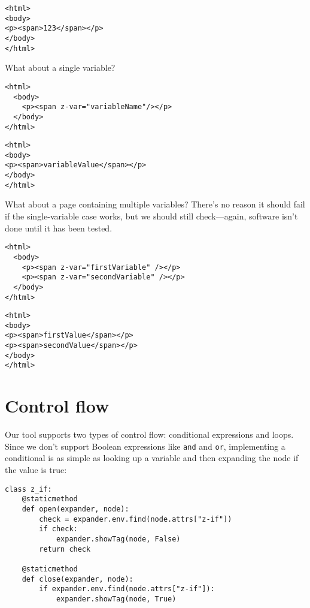 \documentclass{scrbook}
\begin{document}
\begin{lstlisting}[frame=single,frameround=tttt]
<html>
<body>
<p><span>123</span></p>
</body>
</html>
\end{lstlisting}



What about a single variable?


\begin{lstlisting}[frame=single,frameround=tttt]
<html>
  <body>
    <p><span z-var="variableName"/></p>
  </body>
</html>
\end{lstlisting}



\begin{lstlisting}[frame=single,frameround=tttt]
<html>
<body>
<p><span>variableValue</span></p>
</body>
</html>
\end{lstlisting}



What about a page containing multiple variables?
There's no reason it should fail if the single-variable case works,
but we should still check—again,
software isn't done until it has been tested.


\begin{lstlisting}[frame=single,frameround=tttt]
<html>
  <body>
    <p><span z-var="firstVariable" /></p>
    <p><span z-var="secondVariable" /></p>
  </body>
</html>
\end{lstlisting}



\begin{lstlisting}[frame=single,frameround=tttt]
<html>
<body>
<p><span>firstValue</span></p>
<p><span>secondValue</span></p>
</body>
</html>
\end{lstlisting}


\section{Control flow}\label{templating-flow}


Our tool supports two types of control flow:
conditional expressions and loops.
Since we don't support Boolean expressions like \texttt{and} and \texttt{or},
implementing a conditional is as simple as looking up a variable
and then expanding the node if the value is true:


\begin{lstlisting}[frame=single,frameround=tttt]
class z_if:
    @staticmethod
    def open(expander, node):
        check = expander.env.find(node.attrs["z-if"])
        if check:
            expander.showTag(node, False)
        return check

    @staticmethod
    def close(expander, node):
        if expander.env.find(node.attrs["z-if"]):
            expander.showTag(node, True)
\end{lstlisting}
\end{document}
